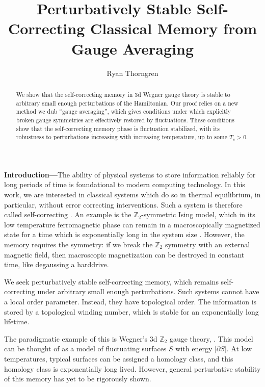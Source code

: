 \documentclass[prx,letterpaper,aps,superscriptaddress,floatfix,twocolumn,nofootinbib]{revtex4-2}
\theoremstyle{definition}
\begin{document}
\title{Perturbatively Stable Self-Correcting Classical Memory from Gauge Averaging}
\author{Ryan Thorngren}

\begin{abstract}
    We show that the self-correcting memory in 3d Wegner gauge theory is stable to arbitrary small enough perturbations of the Hamiltonian. Our proof relies on a new method we dub ``gauge averaging'', which gives conditions under which explicitly broken gauge symmetries are effectively restored by fluctuations. These conditions show that the self-correcting memory phase is fluctuation stabilized, with its robustness to perturbations increasing with increasing temperature, up to some $T_c > 0$.
\end{abstract}

\maketitle


\textbf{Introduction---}The ability of physical systems to store information reliably for long periods of time is foundational to modern computing technology. In this work, we are interested in classical systems which do so in thermal equilibrium, in particular, without error correcting interventions. Such a system is therefore called self-correcting \cite{Bravyi_2009,landon2013local,brown2016quantum}. An example is the $\mathbb{Z}_2$-symmetric Ising model, which in its low temperature ferromagnetic phase can remain in a macroscopically magnetized state for a time which is exponentially long in the system size \cite{thomas1989bound,martinelli2004lectures}. However, the memory requires the symmetry: if we break the $\mathbb{Z}_2$ symmetry with an external magnetic field, then macroscopic magnetization can be destroyed in constant time, like degaussing a harddrive.

We seek perturbatively stable self-correcting memory, which remains self-correcting under arbitrary small enough perturbations. Such systems cannot have a local order parameter. Instead, they have topological order. The information is stored by a topological winding number, which is stable for an exponentially long lifetime.

The paradigmatic example of this is Wegner's 3d $\mathbb{Z}_2$ gauge theory, \cite{Wegner1971duality}. This model can be thought of as a model of fluctuating surfaces $S$ with energy $|\partial S|$. At low temperatures, typical surfaces can be assigned a homology class, and this homology class is exponentially long lived. However, general perturbative stability of this memory has yet to be rigorously shown.
\end{document}
